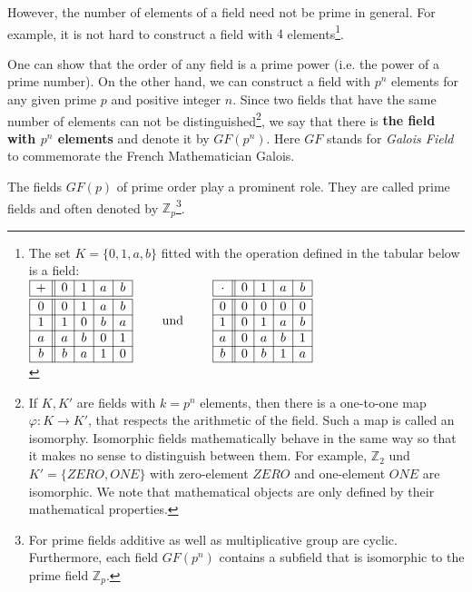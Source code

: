 However, the number of elements of a field need not be prime in general. For example, it is not hard to construct a field with $4$ elements\footnote{%
The set $K=\{0,1,a,b\}$ fitted with the operation defined in the tabular below is a field:\\
$
\begin{array}{|c||c|c|c|c|} 
\hline 
+ & 0 & 1 & a & b \\
\hline \hline
0 & 0 & 1 & a & b \\
\hline 
1 & 1 & 0 & b & a \\
\hline 
a & a & b & 0 & 1 \\
\hline 
b & b & a & 1 & 0 \\
\hline 
\end{array} \qquad {\rm ~und~} \qquad
\begin{array}{|c||c|c|c|c|} 
\hline 
\cdot & 0 & 1 & a & b  \\
\hline \hline
0 & 0 & 0 & 0 & 0 \\ 
\hline 
1 & 0 & 1 & a & b \\ 
\hline 
a & 0 & a & b & 1 \\ 
\hline 
b & 0 & b & 1 & a \\
\hline 
\end{array} 
$  \\
}.

One can show that the order of any field is a prime power (i.e. the power of a prime number). On the other hand, we can construct a field with $p^n$ elements for any given prime $p$ and positive integer $n$. Since two fields that have the same number of elements can not be distinguished\footnote{If $K,K'$ are fields with $k=p^n$ elements, then there is a one-to-one map $\varphi:K\to K'$, that respects the arithmetic of the field. Such a map is called an isomorphy. Isomorphic fields mathematically behave in the same way so that   it makes no sense to distinguish between them. For example, ${\mathbb Z}_2$ und $K'=\{ ZERO,ONE\}$ with zero-element $ZERO$ and one-element $ONE$ are isomorphic. We note that mathematical objects are only defined by their mathematical properties.}, we say that there is {\bf the field with $p^n$ elements} and denote it by $GF(p^n)$. Here $GF$ stands for {\it Galois Field} to commemorate the French Mathematician Galois.

The fields $GF(p)$ of prime order play a prominent role. They are called prime fields and often denoted by ${\mathbb Z}_p$\footnote{For prime fields additive as well as multiplicative group are cyclic. Furthermore, each field $GF(p^n)$ contains a subfield that is isomorphic to the prime field ${\mathbb Z}_p$.}.



